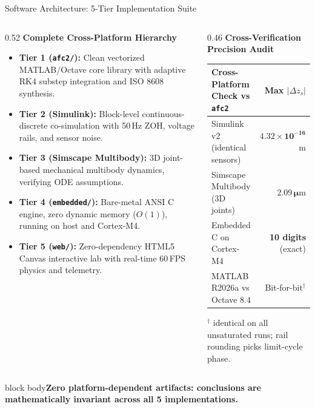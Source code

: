 \documentclass[aspectratio=169,10pt]{beamer}
\newcommand{\takeaway}[1]{\vfill\begin{beamercolorbox}[wd=\linewidth,sep=1ex]{block body}\color{accent}\bfseries #1\end{beamercolorbox}}
\begin{document}
\begin{frame}{Software Architecture: 5-Tier Implementation Suite}
\begin{columns}[T]
\begin{column}{0.52\linewidth}
{\color{accent}\bfseries Complete Cross-Platform Hierarchy}
\begin{itemize}\itemsep1pt\footnotesize
\item \textbf{Tier 1 (\texttt{afc2/}):} Clean vectorized MATLAB/Octave core library with adaptive RK4 substep integration and ISO 8608 synthesis.
\item \textbf{Tier 2 (Simulink):} Block-level continuous-discrete co-simulation with 50\,Hz ZOH, voltage rails, and sensor noise.
\item \textbf{Tier 3 (Simscape Multibody):} 3D joint-based mechanical multibody dynamics, verifying ODE assumptions.
\item \textbf{Tier 4 (\texttt{embedded/}):} Bare-metal ANSI C engine, zero dynamic memory ($O(1)$), running on host and Cortex-M4.
\item \textbf{Tier 5 (\texttt{web/}):} Zero-dependency HTML5 Canvas interactive lab with real-time 60\,FPS physics and telemetry.
\end{itemize}
\end{column}
\begin{column}{0.46\linewidth}
{\color{accent}\bfseries Cross-Verification Precision Audit}
\par\vspace{0.05cm}
\footnotesize
\begin{tabular}{@{}lr@{}}\toprule
Cross-Platform Check vs \texttt{afc2} & Max $|\Delta z_s|$\\\midrule
Simulink v2 (identical sensors) & $\mathbf{4.32\times10^{-16}}$\,m\\
Simscape Multibody (3D joints) & $\mathbf{2.09\,\mu}$m\\
Embedded C on Cortex-M4 & \textbf{10 digits} (exact)\\
MATLAB R2026a vs Octave 8.4 & Bit-for-bit$^\dagger$\\\bottomrule
\end{tabular}\par\vspace{0.1cm}
{\color{muted}\tiny $^\dagger$ identical on all unsaturated runs; rail rounding picks limit-cycle phase.}
\end{column}
\end{columns}
\par\vspace{0.1cm}
\takeaway{Zero platform-dependent artifacts: conclusions are mathematically invariant across all 5 implementations.}
\end{frame}
\end{document}

